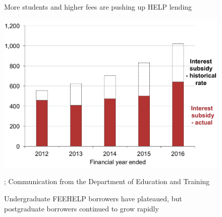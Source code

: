 \documentclass[embargoed]{grattan}
\begin{document}
\begin{figure}
\begin{minipage}[t][\textheight]{\columnwidth}
\vspace{\grattanfptop}
\caption[More students and higher fees are pushing up {HELP} lending]{More students and higher fees are pushing up \gls{HELP} lending}\label{fig:fig4-more-students-higher-fees-are-pushing-up-HELP-lending}
\includegraphics[page=4]{atlas/Chartpack.pdf}

%
{\textcites{EducationvariousyearsHighereducationreport}{Government2016Budget201617}{ABS2016ConsumerPriceIndex}{Birmingham2016MediareleaseNew}; Communication from the Department of Education and Training}
\end{minipage}
\hfill 
\begin{minipage}[t][\textheight]{\columnwidth}
\vspace{\grattanfptop}
\caption[Undergraduate FEE-HELP borrowers have plateaued, but postgraduate borrowers continued to grow rapidly]{Undergraduate \gls{FEEHELP} borrowers have plateaued, but postgraduate borrowers continued to grow rapidly}\label{fig:fig5-undergrad-HELP-borrowers-have-plateaued-but-postgrad-borrowers-continued-to-grow-rapidly}


\end{minipage}
\end{figure}
\end{document}
